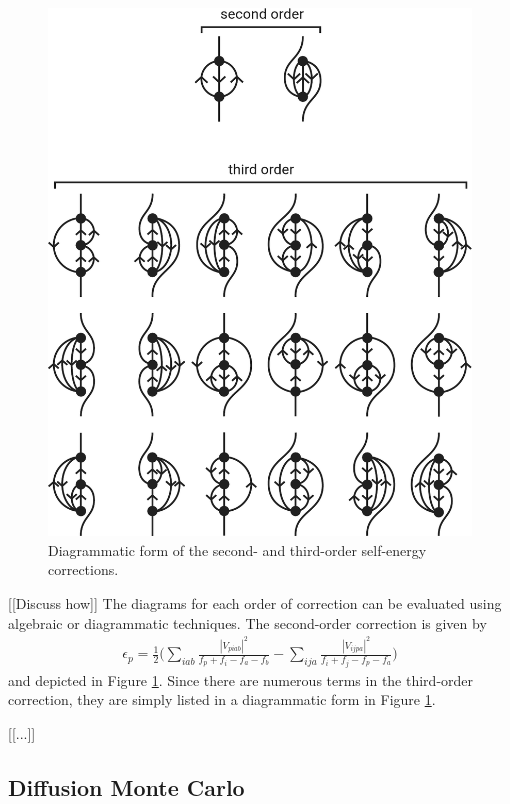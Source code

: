\documentclass[amsmath, amssymb, aps, floatfix, nofootinbib, preprintnumbers,showpacs, superscriptaddress, twocolumn]{revtex4-1}
\begin{document}
\begin{figure}
\includegraphics[width=.48\textwidth]{fig-diagrams-sfe}
\caption{Diagrammatic form of the second- and third-order self-energy
  corrections.}
\label{fig:diagrams-sfe}
\end{figure}
[[Discuss how]]
The diagrams for each order of correction can be evaluated using algebraic or
diagrammatic techniques.  The second-order correction is given by
\begin{gather*}
  \epsilon_p = \frac{1}{2} \biggl(
      \sum_{i a b} \frac{|V_{p i a b}|^2}{f_p + f_i - f_a - f_b}
    - \sum_{i j a} \frac{|V_{i j p a}|^2}{f_i + f_j - f_p - f_a}
  \biggr)
\end{gather*}
and depicted in Figure \ref{fig:diagrams-sfe}.  Since there are numerous terms in
the third-order correction, they are simply listed in a diagrammatic form in
Figure \ref{fig:diagrams-sfe}.

[[...]]

\subsection{Diffusion Monte Carlo}
\end{document}
